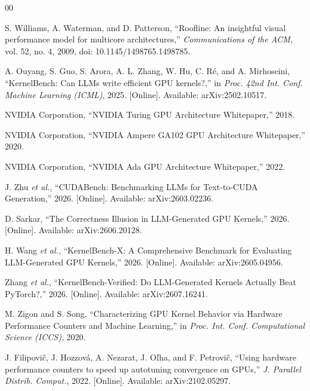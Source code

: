 \documentclass[conference]{IEEEtran}
\begin{document}
\begin{thebibliography}{00}

 S. Williams, A. Waterman, and D. Patterson, ``Roofline: An insightful visual
performance model for multicore architectures,'' \textit{Communications of the ACM}, vol. 52,
no. 4, 2009, doi: 10.1145/1498765.1498785.

 A. Ouyang, S. Guo, S. Arora, A. L. Zhang, W. Hu, C. Ré, and A. Mirhoseini,
``KernelBench: Can LLMs write efficient GPU kernels?,'' in \textit{Proc. 42nd Int. Conf. Machine
Learning (ICML)}, 2025. [Online]. Available: arXiv:2502.10517.

 NVIDIA Corporation, ``NVIDIA Turing GPU Architecture Whitepaper,'' 2018.

 NVIDIA Corporation, ``NVIDIA Ampere GA102 GPU Architecture Whitepaper,'' 2020.

 NVIDIA Corporation, ``NVIDIA Ada GPU Architecture Whitepaper,'' 2022.

 J. Zhu \textit{et al.}, ``CUDABench: Benchmarking LLMs for Text-to-CUDA
Generation,'' 2026. [Online]. Available: arXiv:2603.02236.

 D. Sarkar, ``The Correctness Illusion in LLM-Generated GPU
Kernels,'' 2026. [Online]. Available: arXiv:2606.20128.

 H. Wang \textit{et al.}, ``KernelBench-X: A Comprehensive Benchmark for
Evaluating LLM-Generated GPU Kernels,'' 2026. [Online]. Available: arXiv:2605.04956.

 Zhang \textit{et al.}, ``KernelBench-Verified: Do LLM-Generated
Kernels Actually Beat PyTorch?,'' 2026. [Online]. Available: arXiv:2607.16241.

 M. Zigon and S. Song, ``Characterizing GPU Kernel Behavior via Hardware
Performance Counters and Machine Learning,'' in \textit{Proc. Int. Conf. Computational Science
(ICCS)}, 2020.

 J. Filipovi\v{c}, J. Hozzov\'{a}, A. Nezarat, J. O\v{l}ha, and F. Petrovi\v{c},
``Using hardware performance counters to speed up autotuning convergence on GPUs,''
\textit{J. Parallel Distrib. Comput.}, 2022. [Online]. Available: arXiv:2102.05297.

\end{thebibliography}
\end{document}
